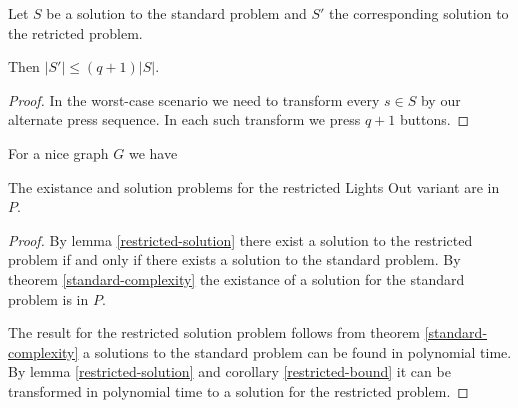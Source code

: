 \begin{corollary}\label{restricted-bound}
    Let $S$ be a solution to the standard problem and $S'$ the corresponding solution to the retricted problem.

    Then $|S'|\leq(q+1)|S|$.
\end{corollary}

\begin{proof}
    In the worst-case scenario we need to transform every $s\in S$ by our alternate press sequence. In each such transform we press $q+1$ buttons. 
\end{proof}

\begin{theorem}
    For a nice graph $G$ we have

    The existance and solution problems for the restricted Lights Out variant are in $P$.
\end{theorem}

\begin{proof}
    By lemma \ref{restricted-solution} there exist a solution to the restricted problem if and only if there exists a solution to the standard problem.
    By theorem \ref{standard-complexity} the existance of a solution for the standard problem is in $P$.

    The result for the restricted solution problem follows from theorem \ref{standard-complexity} a solutions to the standard problem can be found in polynomial time.
    By lemma \ref{restricted-solution} and corollary \ref{restricted-bound} it can be transformed in polynomial time to a solution for the restricted problem.
\end{proof}
